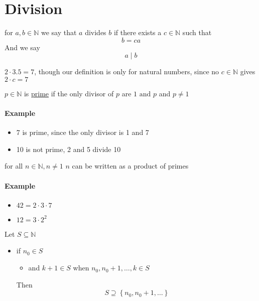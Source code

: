 \documentclass[11pt]{book}
\begin{document}

\section{Division}%
\label{sec:division}

\begin{defn}[Divides]\label{defn:divides}
    for $a, b \in \mathbb{N} $ we say that $a$ divides $b$ if there exists a $c \in \mathbb{N} $ such that 
    \[
    b= ca
    \]
    And we say 
    \[
    a \mid b
    \]
\end{defn}
\begin{remark}
    $2 \cdot 3.5 = 7$, though our definition is only for natural numbers, since no $c \in \mathbb{N} $ gives $2 \cdot c = 7$ 
\end{remark}

\begin{defn}[Prime]\label{defn:prime}
    $p \in \mathbb{N} $ is \underline{prime} if the only divisor of $p$ are $1 \text{ and } p$ and $p\neq 1$ 
\end{defn}

\paragraph{Example} 
\begin{itemize}
    \item 7 is prime, since the only divisor is 1 and 7
    \item 10 is not prime, 2 and 5 divide 10
\end{itemize}

\begin{thm}\label{thm:product_of_primes}
    for all $n \in \mathbb{N} ,n \neq 1$ $n$ can be written as a product of primes 
\end{thm}

\paragraph{Example} 
\begin{itemize}
    \item $42 = 2  \cdot 3 \cdot 7$ 
    \item $12 = 3  \cdot 2^{2} $ 
\end{itemize}

\newpage

\begin{defn}\label{defn:complete_induction}
    Let $S\subseteq \mathbb{N} $ 
    \begin{itemize}
        \item if $n_{0} \in S$ 
        \begin{itemize}
            \item and $k + 1 \in S$ when $n_{0} , n_{0}  + 1, \ldots , k \in S$ 
        \end{itemize}
        Then 
        \[
        S \supseteq \left\{ n_{0} , n_{0}  + 1, \ldots  \right\} 
        \]
    \end{itemize}
\end{defn}
\end{document}

